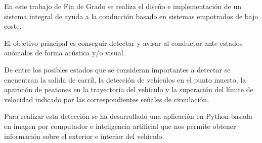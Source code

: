 \label{sec_resumen}
En este trabajo de Fin de Grado se realiza el diseño e implementación de  un sistema integral de ayuda a la conducción basado en sistemas empotrados de bajo coste.

El objetivo principal es conseguir detectar y avisar al conductor ante estados anómalos de forma acústica y/o visual.

De entre los posibles estados que se consideran importantes a detectar se encuentran la salida de carril, la detección de vehículos en el punto muerto, la aparición de peatones en la trayectoria del vehículo y la superación del límite de velocidad indicado por las correspondientes señales de circulación.

Para realizar esta detección se ha desarrollado una aplicación en Python basada en imagen por computador e inteligencia artificial que nos permite obtener información sobre el exterior e interior del vehículo.
